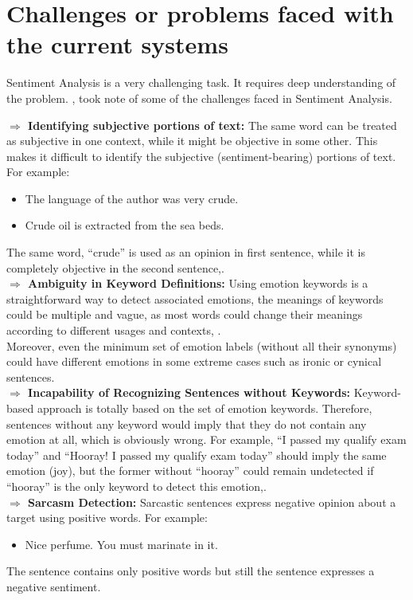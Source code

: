 \section{Challenges or problems faced with the current systems}
Sentiment Analysis is a very challenging task. It requires deep understanding of the problem.
\cite{ref39}, took note of some of the challenges faced in Sentiment Analysis.

\textbf{$\Rightarrow$ Identifying subjective portions of text:} The same word can be treated as subjective in
one context, while it might be objective in some other. This makes it difficult to identify
the subjective (sentiment-bearing) portions of text. For example:
\begin{itemize}
\item The language of the author was very crude.
\item Crude oil is extracted from the sea beds.
\end{itemize}

The same word, “crude” is used as an opinion in first sentence, while it is completely
objective in the second sentence,\cite{ref20}.\\
\textbf{$\Rightarrow$ Ambiguity in Keyword Definitions:} Using emotion keywords is a straightforward way
to detect associated emotions, the meanings of keywords could be multiple and vague,
as most words could change their meanings according to different usages and contexts,
\cite{ref39}.\\
Moreover, even the minimum set of emotion labels (without all their synonyms) could
have different emotions in some extreme cases such as ironic or cynical sentences.\\
\textbf{$\Rightarrow$ Incapability of Recognizing Sentences without Keywords:} Keyword-based approach is
totally based on the set of emotion keywords. Therefore, sentences without any keyword
would imply that they do not contain any emotion at all, which is obviously wrong.
For example, “I passed my qualify exam today” and “Hooray! I passed my qualify exam
today” should imply the same emotion (joy), but the former without “hooray” could
remain undetected if “hooray” is the only keyword to detect this emotion,\cite{ref39}.\\


\textbf{$\Rightarrow$ Sarcasm Detection:} Sarcastic sentences express negative opinion about a target using
positive words. For example:\\
\begin{itemize}
\item Nice perfume. You must marinate in it.
\end{itemize}
The sentence contains only positive words but still the sentence expresses a negative
sentiment.\\


